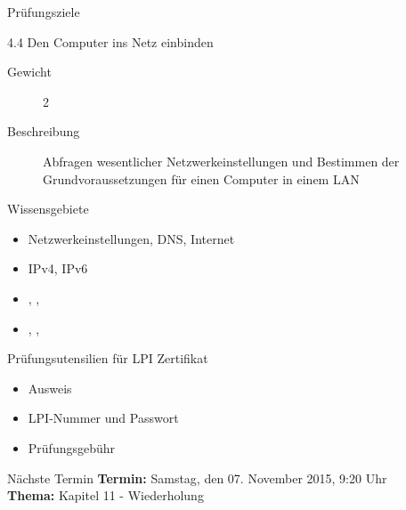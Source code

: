\documentclass[aspectratio=43]{beamer}
\begin{document}
\begin{frame}{Prüfungsziele}
  \begin{alertblock}{4.4 Den Computer ins Netz einbinden}
    \begin{description}
      \item[Gewicht]  2
      \item[Beschreibung] Abfragen wesentlicher Netzwerkeinstellungen und Bestimmen der 
              Grundvoraussetzungen für einen Computer in einem LAN
    \end{description}
       Wissensgebiete\\ 
        \begin{itemize}
          \item Netzwerkeinstellungen, DNS, Internet
          \item IPv4, IPv6
          \item {}, , 
          \item {}, , 
        \end{itemize}
  \end{alertblock}
\end{frame}

\begin{frame}[plain]
  \begin{alertblock}{Prüfungsutensilien für LPI Zertifikat}
    \begin{itemize}
      \item Ausweis
      \item LPI-Nummer und Passwort
      \item Prüfungsgebühr
    \end{itemize}
  \end{alertblock}
\end{frame}
\begin{frame}[plain]
  \begin{alertblock}{Nächste Termin}
    \textbf{Termin:} Samstag, den 07. November 2015, 9:20 Uhr\\
    \textbf{Thema:} Kapitel 11 - Wiederholung\\
  \end{alertblock}
\end{frame}



\materialframe
\versionframe
\end{document}
